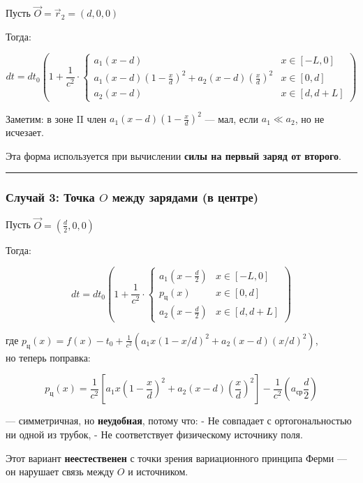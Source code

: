 \documentclass[11pt]{article}
\begin{document}
Пусть \(\vec{O} = \vec{r}_2 = (d, 0, 0)\)

Тогда:

\[
\boxed{
dt = dt_0 \left( 1 + \frac{1}{c^2} \cdot
\begin{cases}
a_1 (x - d) & x \in [-L, 0] \\
a_1 (x - d) \left(1 - \frac{x}{d}\right)^2 + a_2 (x - d) \left(\frac{x}{d}\right)^2 & x \in [0, d] \\
a_2 (x - d) & x \in [d, d+L]
\end{cases}
\right)
}
\]

Заметим: в зоне II член \(a_1 (x - d) \left(1 - \frac{x}{d}\right)^2\)
--- мал, если \(a_1 \ll a_2\), но не исчезает.

 Эта форма используется при вычислении \textbf{силы на первый заряд от
второго}.

\begin{center}\rule{0.5\linewidth}{\linethickness}\end{center}

\subsubsection{\texorpdfstring{ Случай 3: Точка \(O\) между зарядами (в
центре)}{ Случай 3: Точка O между зарядами (в центре)}}

Пусть \(\vec{O} = \left( \frac{d}{2}, 0, 0 \right)\)

Тогда:

\[
\boxed{
dt = dt_0 \left( 1 + \frac{1}{c^2} \cdot
\begin{cases}
a_1 \left(x - \frac{d}{2}\right) & x \in [-L, 0] \\
p_{\text{ц}}(x) & x \in [0, d] \\
a_2 \left(x - \frac{d}{2}\right) & x \in [d, d+L]
\end{cases}
\right)
}
\]

где
\(p_{\text{ц}}(x) = f(x) - t_0 + \frac{1}{c^2} \left( a_1 x (1 - x/d)^2 + a_2 (x - d)(x/d)^2 \right)\),\\
но теперь поправка:

\[
p_{\text{ц}}(x) = \frac{1}{c^2} \left[ a_1 x \left(1 - \frac{x}{d}\right)^2 + a_2 (x - d) \left(\frac{x}{d}\right)^2 \right] - \frac{1}{c^2} \left( a_{\text{ср}} \frac{d}{2} \right)
\]

--- симметричная, но \textbf{неудобная}, потому что: - Не совпадает с
ортогональностью ни одной из трубок, - Не соответствует физическому
источнику поля.

 Этот вариант \textbf{неестественен} с точки зрения вариационного
принципа Ферми --- он нарушает связь между \(O\) и источником.
\end{document}
